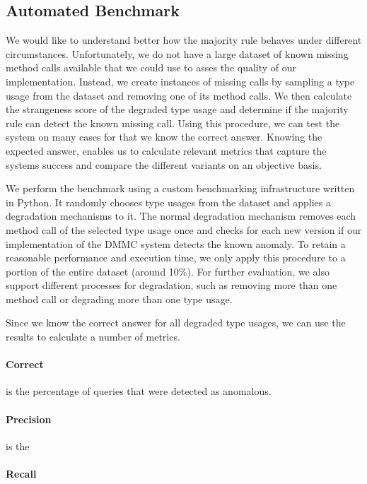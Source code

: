 \subsection{Automated Benchmark}

We would like to understand better how the majority rule behaves under different circumstances.
Unfortunately, we do not have a large dataset of known missing method calls available that we could use to asses the quality of our implementation.
Instead, we create instances of missing calls by sampling a type usage from the dataset and removing one of its method calls.
We then calculate the strangeness score of the degraded type usage and determine if the majority rule can detect the known missing call.
Using this procedure, we can test the system on many cases for that we know the correct answer.
Knowing the expected answer, enables us to calculate relevant metrics that capture the systems success and compare the different variants on an objective basis.

We perform the benchmark using a custom benchmarking infrastructure written in Python.
It randomly chooses type usages from the dataset and applies a degradation mechanisms to it.
The normal degradation mechanism removes each method call of the selected type usage once and checks for each new version if our implementation of the $\text{DMMC}$ system detects the known anomaly.
To retain a reasonable performance and execution time, we only apply this procedure to a portion of the entire dataset (around 10\%).
For further evaluation, we also support different processes for degradation, such as removing more than one method call or degrading more than one type usage.

Since we know the correct answer for all degraded type usages, we can use the results to calculate a number of metrics.
\paragraph{Correct} is the percentage of queries that were detected as anomalous.
\paragraph{Precision} is the 
\paragraph{Recall}

